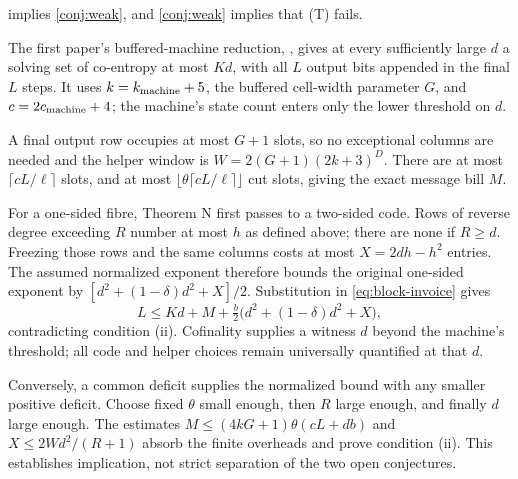 \begin{theorem}\label{thm:F}
 implies \cref{conj:weak}, and \cref{conj:weak} implies that \textup{(T)} fails.
\end{theorem}
\begin{outline}
The first paper's buffered-machine reduction, , gives at every
sufficiently large $d$ a solving set of co-entropy at most $Kd$, with all $L$ output bits appended in the final $L$
steps. It uses $k=k_{\rm machine}+5$, the buffered cell-width parameter $G$, and $c=2c_{\rm machine}+4$; the machine's
state count enters only the lower threshold on $d$.

A final output row occupies at most $G+1$ slots, so no exceptional columns are needed and the helper window is
$W=2(G+1)(2k+3)^D$. There are at most $\lceil cL/\ell\rceil$ slots, and at most
$\lfloor\theta\lceil cL/\ell\rceil\rfloor$ cut slots, giving the exact message bill $M$.

For a one-sided fibre, Theorem N first passes to a two-sided code. Rows of reverse degree exceeding $R$ number at
most $h$ as defined above; there are none if $R\ge d$. Freezing those rows and the same columns costs at most
$X=2dh-h^2$ entries. The assumed normalized exponent therefore bounds the original one-sided exponent by
$[d^2+(1-\delta)d^2+X]/2$. Substitution in \cref{eq:block-invoice} gives
\[
 L\le Kd+M+\tfrac b2\bigl(d^2+(1-\delta)d^2+X\bigr),
\]
contradicting condition (ii). Cofinality supplies a witness $d$ beyond the machine's threshold; all code and helper
choices remain universally quantified at that $d$.

Conversely, a common deficit supplies the normalized bound with any smaller positive deficit. Choose fixed
$\theta$ small enough, then $R$ large enough, and finally $d$ large enough. The estimates
$M\le(4kG+1)\theta(cL+db)$ and $X\le2Wd^2/(R+1)$ absorb the finite overheads and prove condition (ii).
This establishes implication, not strict separation of the two open conjectures.
\end{outline}

